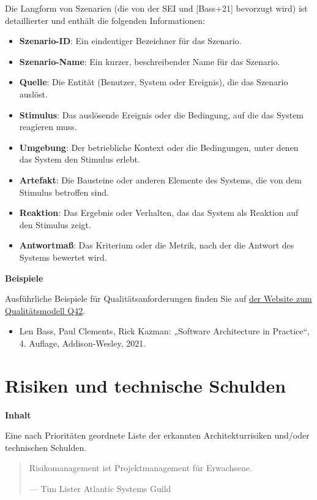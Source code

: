 \documentclass[a4paper,12pt]{article}
\begin{document}
Die Langform von Szenarien (die von der SEI und {[}Bass+21{]} bevorzugt
wird) ist detaillierter und enthält die folgenden Informationen:

\begin{itemize}
\item
  \textbf{Szenario-ID}: Ein eindeutiger Bezeichner für das Szenario.
\item
  \textbf{Szenario-Name}: Ein kurzer, beschreibender Name für das
  Szenario.
\item
  \textbf{Quelle}: Die Entität (Benutzer, System oder Ereignis), die das
  Szenario auslöst.
\item
  \textbf{Stimulus}: Das auslösende Ereignis oder die Bedingung, auf die
  das System reagieren muss.
\item
  \textbf{Umgebung}: Der betriebliche Kontext oder die Bedingungen,
  unter denen das System den Stimulus erlebt.
\item
  \textbf{Artefakt}: Die Bausteine oder anderen Elemente des Systems,
  die von dem Stimulus betroffen sind.
\item
  \textbf{Reaktion}: Das Ergebnis oder Verhalten, das das System als
  Reaktion auf den Stimulus zeigt.
\item
  \textbf{Antwortmaß}: Das Kriterium oder die Metrik, nach der die
  Antwort des Systems bewertet wird.
\end{itemize}

\textbf{Beispiele}

Ausführliche Beispiele für Qualitätsanforderungen finden Sie auf
\href{https://quality.arc42.org}{der Website zum Qualitätsmodell Q42}.

\begin{itemize}
\item
  Len Bass, Paul Clements, Rick Kazman: „Software Architecture in
  Practice``, 4. Auflage, Addison-Wesley, 2021.
\end{itemize}
\newpage
\section{Risiken und technische Schulden}\label{section-technical-risks}

\textbf{Inhalt}

Eine nach Prioritäten geordnete Liste der erkannten Architekturrisiken
und/oder technischen Schulden.

\begin{quote}
Risikomanagement ist Projektmanagement für Erwachsene.

---  Tim Lister Atlantic Systems Guild
\end{quote}
\end{document}
